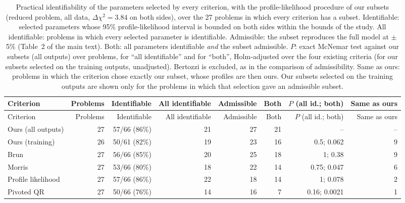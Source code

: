 \begin{longtable}{@{}lrrrrrrr@{}}
\caption{Practical identifiability of the parameters selected by every criterion, with the profile-likelihood procedure of our subsets (reduced problem, all data, $\Delta\chi^2=3.84$ on both sides), over the 27 problems in which every criterion has a subset. Identifiable: selected parameters whose 95\% profile-likelihood interval is bounded on both sides within the bounds of the study. All identifiable: problems in which every selected parameter is identifiable. Admissible: the subset reproduces the full model at $\pm$5\% (Table~2 of the main text). Both: all parameters identifiable \emph{and} the subset admissible. $P$: exact McNemar test against our subsets (all outputs) over problems, for ``all identifiable'' and for ``both'', Holm-adjusted over the four existing criteria (for our subsets selected on the training outputs, unadjusted). Bertozzi is excluded, as in the comparison of admissibility. Same as ours: problems in which the criterion chose exactly our subset, whose profiles are then ours. Our subsets selected on the training outputs are shown only for the problems in which that selection gave an admissible subset.}\label{tab:identifcrit}\\
\toprule
Criterion & Problems & Identifiable & All identifiable & Admissible & Both & $P$ (all id.; both) & Same as ours \\
\midrule
\endfirsthead
\toprule
Criterion & Problems & Identifiable & All identifiable & Admissible & Both & $P$ (all id.; both) & Same as ours \\
\midrule
\endhead
Ours (all outputs) & 27 & 57/66 (86\%) & 21 & 27 & 21 & -- & -- \\
Ours (training) & 26 & 50/61 (82\%) & 19 & 23 & 16 & 0.5; 0.062 & 9 \\
Brun & 27 & 56/66 (85\%) & 20 & 25 & 18 & 1; 0.38 & 9 \\
Morris & 27 & 53/66 (80\%) & 18 & 22 & 14 & 0.75; 0.047 & 6 \\
Profile likelihood & 27 & 57/66 (86\%) & 22 & 18 & 14 & 1; 0.078 & 2 \\
Pivoted QR & 27 & 50/66 (76\%) & 14 & 16 & 7 & 0.16; 0.0021 & 1 \\
\bottomrule
\end{longtable}
